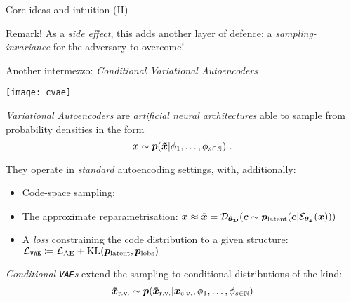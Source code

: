 {\begin{frame}{ Core ideas and intuition (II)}
    \begin{block}{Remark!}
    As a \textit{side effect}, this adds another layer of defence: a \textit{sampling-\alert{invariance}} for the adversary to overcome!
    \end{block}



    \end{frame}

    \begin{frame}{ Another intermezzo: \textit{Conditional Variational Autoencoders}}
        \begin{minipage}[]{0.5\textwidth}
    \vspace{0px}
    \texttt{[image: cvae]}
    \end{minipage}
    \begin{minipage}[]{0.45\textwidth}
        \vspace{0pt}
        \textit{Variational Autoencoders} are \textit{artificial neural architectures} able to \alert{sample} from probability densities in the form
        $$ \bm{x} \sim \bm{p}(\bm{\tilde{x}} | \phi_1, \dots, \phi_{s\in\mathbb{N}}) \text{ .}$$

        They operate in \textit{standard} \alert{autoencoding} settings, with, additionally:
        \begin{itemize}
            \item Code-space sampling;
            \item The approximate \alert{reparametrisation}: $\bm{x} \approx \bm{\tilde{x}} = \mathcal{D}_{\bm{\theta_{\mathcal{D}}}}(\bm{c} \sim \bm{p}_{\text{latent}}(\bm{c}| \mathcal{E}_{\bm{\theta_{\mathcal{E}}}}(\bm{x})))$
            \item A \textit{loss} constraining the code distribution to a given \alert{structure}: $\mathcal{L}_{\texttt{VAE}} \coloneqq \mathcal{L}_{\text{AE}} + \operatorname*{\text{KL}}(\bm{p}_{\text{latent}},\bm{p}_{\text{lobs}})$
        \end{itemize}

        \textit{Conditional \texttt{VAE}s} extend the sampling to \alert{conditional} distributions of the kind: $${\bm{\tilde{x}_{\text{r.v.}}} \sim \bm{p}(\bm{\tilde{x}_{\text{r.v.}}} | \bm{{x}_{\text{c.v.}}}, \phi_1, \dots, \phi_{s\in\mathbb{N}})}$$
    \end{minipage}
    \end{frame}

}
